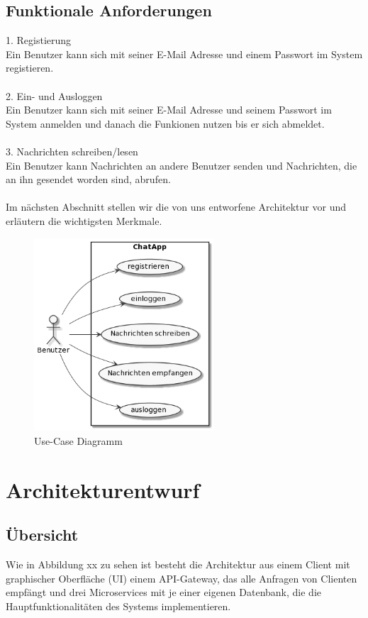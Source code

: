 \subsection{Funktionale Anforderungen}
1. Registierung\\
Ein Benutzer kann sich mit seiner E-Mail Adresse und einem Passwort im System registieren.\\
\\
2. Ein- und Ausloggen\\
Ein Benutzer kann sich mit seiner E-Mail Adresse und seinem Passwort im System anmelden und danach die Funkionen nutzen bis er sich abmeldet.\\
\\
3. Nachrichten schreiben/lesen\\
Ein Benutzer kann Nachrichten an andere Benutzer senden und Nachrichten, die an ihn gesendet worden sind, abrufen.\\
\\
Im nächsten Abschnitt stellen wir die von uns entworfene Architektur vor und erläutern die wichtigsten Merkmale. 

\begin{figure}[bth] 
	\centering
	\includegraphics[width=0.6\textwidth]{Graphics/Usecase-Diagramm.png}
	\caption{Use-Case Diagramm}
\end{figure}

\section{Architekturentwurf}

\subsection{Übersicht}
Wie in Abbildung xx zu sehen ist besteht die Architektur aus einem Client mit graphischer Oberfläche (UI) einem API-Gateway, das alle Anfragen von Clienten empfängt und drei Microservices mit je einer eigenen Datenbank, die die Hauptfunktionalitäten des Systems implementieren.

